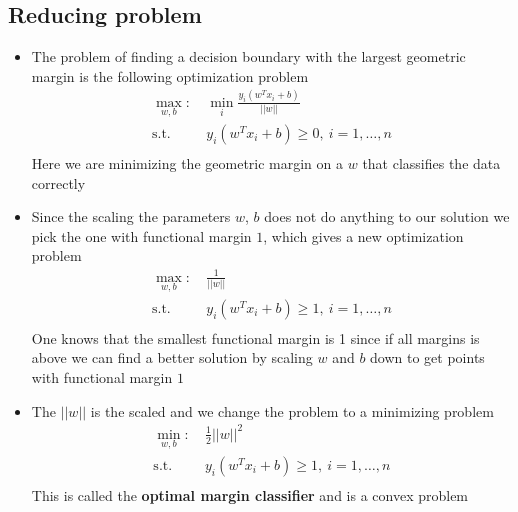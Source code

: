 \documentclass[a4, english]{article}
\begin{document}
\subsection{Reducing problem}
\begin{itemize}
	\item The problem of finding a decision boundary with the largest geometric margin is the following optimization problem 
\begin{equation*}
  \begin{split} 
    \max_{w,b}: \ &\min_i \frac{y_i(w^T x_i+b)}{||w||}\\
    \text{s.t.} \ & y_i(w^T x_i+b) \geq 0, \ i= 1, \dots, n \\
  \end{split}
\end{equation*}
  Here we are minimizing the geometric margin on a $w$ that classifies the data correctly 
  \item Since the scaling the parameters $w$, $b$ does not do anything to our solution we pick the one with functional margin $1$, which gives a new optimization problem
\begin{equation*}
  \begin{split} 
     \max_{w,b}: \ & \frac{1}{||w||}\\
    \text{s.t.} \ & y_i(w^T x_i+b) \geq 1, \ i= 1, \dots, n \\
  \end{split}
\end{equation*}
One knows that the smallest functional margin is 1 since if all margins is above we can find a better solution by scaling $w$ and $b$ down to get points with functional margin $1$ 
  \item The $||w||$ is the scaled and we change the problem to a minimizing problem 
\begin{equation*}
  \begin{split} 
     \min_{w,b}: \ & \frac12||w||^2\\
    \text{s.t.} \ & y_i(w^T x_i+b) \geq 1, \ i= 1, \dots, n \\
  \end{split}
\end{equation*}
  This is called the \textbf{optimal margin classifier} and is a convex problem
\end{itemize}
\end{document}
